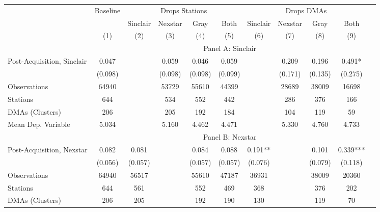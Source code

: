 {\def \sym#1{\ifmmode^{#1}\else\(^{#1}\)\fi} \begin{tabular}{l*{10}{c}} \toprule \ & \multicolumn{1}{c}{Baseline} & \multicolumn{4}{c}{Drops Stations}   & \multicolumn{4}{c}{Drops DMAs} \\ \cmidrule(lr){2-2}\cmidrule(lr){3-6}\cmidrule(lr){7-10} \ & 
 & Sinclair & Nexstar & Gray & Both & Sinclair & Nexstar & Gray & Both \\  \ & (1) & (2) & (3) & (4) & (5) & (6)  & (7)  & (8)  & (9) \\
\midrule \ & \multicolumn{9}{c}{Panel A: Sinclair} \\\cmidrule(lr){2-10}
Post-Acquisition, Sinclair&    0.047   &         &    0.059   &    0.046   &    0.059   &         &    0.209   &    0.196   &    0.491*  \\
                &  (0.098)   &         &  (0.098)   &  (0.098)   &  (0.099)   &         &  (0.171)   &  (0.135)   &  (0.275)   \\
\midrule
Observations    &    64940   &         &    53729   &    55610   &    44399   &         &    28689   &    38009   &    16698   \\
Stations        &      644   &         &      534   &      552   &      442   &         &      286   &      376   &      166   \\
DMAs (Clusters) &      206   &         &      205   &      192   &      184   &         &      104   &      119   &       59   \\
Mean Dep. Variable&    5.034   &         &    5.160   &    4.462   &    4.471   &         &    5.330   &    4.760   &    4.733   \\
\midrule \ & \multicolumn{9}{c}{Panel B: Nexstar} \\\cmidrule(lr){2-10}
Post-Acquisition, Nexstar&    0.082   &    0.081   &         &    0.084   &    0.088   &    0.191** &         &    0.101   &    0.339***\\
                &  (0.056)   &  (0.057)   &         &  (0.057)   &  (0.057)   &  (0.076)   &         &  (0.079)   &  (0.118)   \\
\midrule
Observations    &    64940   &    56517   &         &    55610   &    47187   &    36931   &         &    38009   &    20360   \\
Stations        &      644   &      561   &         &      552   &      469   &      368   &         &      376   &      202   \\
DMAs (Clusters) &      206   &      205   &         &      192   &      190   &      130   &         &      119   &       70   \\

\end{tabular}}
